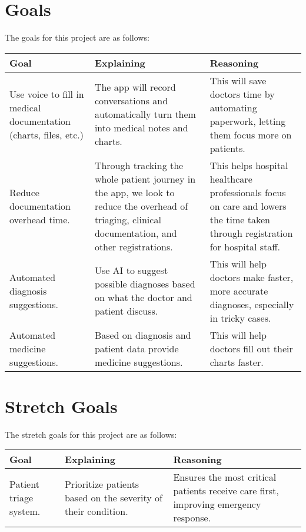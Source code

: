 \documentclass{article}
\begin{document}
\section{Goals}

The goals for this project are as follows:

\begin{table}[H]
    \centering
    \begin{tabular}{p{4cm} p{4cm} p{4cm}}
        \toprule
        \textbf{Goal} & \textbf{Explaining} & \textbf{Reasoning} \\
        \midrule
        Use voice to fill in medical documentation (charts, files, etc.) & The app will record conversations and automatically turn them into medical notes and charts. & This will save doctors time by automating paperwork, letting them focus more on patients. \\
        \midrule
        Reduce documentation overhead time.  & Through tracking the whole patient journey in the app, we look to reduce the overhead of triaging, clinical documentation, and other registrations.  & This helps hospital healthcare professionals focus on care and lowers the time taken through registration for hospital staff. \\
        \midrule
        Automated diagnosis suggestions.  & Use AI to suggest possible diagnoses based on what the doctor and patient discuss.  & This will help doctors make faster, more accurate diagnoses, especially in tricky cases. \\
        \midrule
        Automated medicine suggestions. & Based on diagnosis and patient data provide medicine suggestions. & This will help doctors fill out their charts faster. \\
        \bottomrule
    \end{tabular}
\end{table}

\section{Stretch Goals}

The stretch goals for this project are as follows:

\begin{table}[H]
    \centering
    \begin{tabular}{p{4cm} p{4cm} p{4cm}}
        \toprule
        \textbf{Goal} & \textbf{Explaining} & \textbf{Reasoning} \\ 
        \midrule
        Patient triage system. & Prioritize patients based on the severity of their condition. & Ensures the most critical patients receive care first, improving emergency response. \\
        \bottomrule
    \end{tabular}
\end{table}
\end{document}
